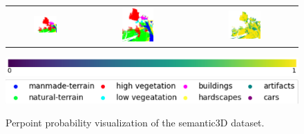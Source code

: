 \begin{figure}[h!]
\begin{tabular}{ccc}
            \includegraphics[width=0.33\textwidth, height=0.18\textheight]{images/seg_output/sem3d_seg_output/3_GT.png} &
            \includegraphics[width=0.33\textwidth, height=0.18\textheight]{images/seg_output/flipout/sem3d_3.png}& 
            \includegraphics[width=0.33\textwidth, height=0.18\textheight]{images/seg_output/flipout/3_fout_prob.png}\\
        \end{tabular}
        \includegraphics[scale=0.45]{images/prob_legend.pdf}
        \includegraphics[scale=0.65]{images/legend.png}
        \caption{Perpoint probability visualization of the semantic3D dataset.}
        \label{fig:fout_sem3d_probmap}
    \end{figure}

